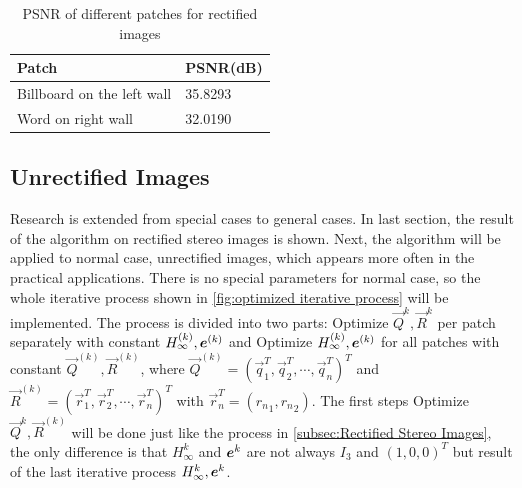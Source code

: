 
\begin{table}[tbp]
	\centering
	\scriptsize  
	\begin{tabular}{p{120pt} p{60pt}}
		\toprule
		Patch & {\bfseries PSNR(dB)}\\ \midrule
		 Billboard on the left wall  &  35.8293\\
		\addlinespace[3pt]
		Word on right wall & 32.0190 \\ \bottomrule
	\end{tabular}
	\caption{PSNR of different patches for rectified images}  
	\label{tab:PSNR of different patches} 
\end{table}

\subsection{Unrectified Images}\label{subsec:Unrectified Images}
Research is extended from special cases to general cases. In last section, the result of the algorithm on rectified stereo images is shown. Next, the algorithm will be applied to normal case, unrectified images, which appears more often in the practical applications. There is no special parameters for normal case, so the whole iterative process shown in \cref{fig:optimized iterative process} will be implemented. The process is divided into two parts: Optimize $\vec{Q}^k, \vec{R}^k$ per patch separately with constant $H_\infty^{(k)}, \boldsymbol{e}^{(k)}$ and Optimize $H_\infty^{(k)}, \boldsymbol{e}^{(k)}$ for all patches with constant $\vec{Q}^{(k)}, \vec{R}^{(k)}$, where $\vec{Q}^{(k)} = (\vec{q}_1^T, \vec{q}_2^T, \cdots, \vec{q}_n^T)^T$ and $\vec{R}^{(k)}= (\vec{r}_1^T, \vec{r}_2^T, \cdots, \vec{r}_n^T)^T$ with $\vec{r}_n^T= ({r_n}_1, {r_n}_2)$. The first steps Optimize $\vec{Q}^k, \vec{R}^{(k)}$  will be done just like the process in \cref{subsec:Rectified Stereo Images}, the only difference is that $H_\infty^k$ and $\boldsymbol{e}^k$ are not always $I_3$ and $(1, 0, 0)^T$ but result of the last iterative process $H_\infty^{k}, \boldsymbol{e}^k$. 

